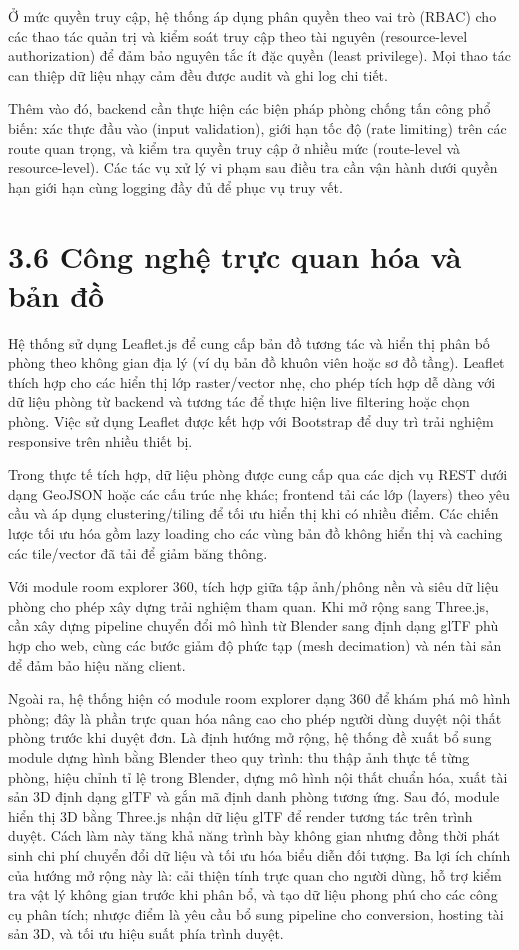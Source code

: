 \documentclass[a4paper,12pt,openany,oneside]{report}
\begin{document}
Ở mức quyền truy cập, hệ thống áp dụng phân quyền theo vai trò (RBAC) cho các thao tác quản trị và kiểm soát truy cập theo tài nguyên (resource-level authorization) để đảm bảo nguyên tắc ít đặc quyền (least privilege). Mọi thao tác can thiệp dữ liệu nhạy cảm đều được audit và ghi log chi tiết.

Thêm vào đó, backend cần thực hiện các biện pháp phòng chống tấn công phổ biến: xác thực đầu vào (input validation), giới hạn tốc độ (rate limiting) trên các route quan trọng, và kiểm tra quyền truy cập ở nhiều mức (route-level và resource-level). Các tác vụ xử lý vi phạm sau điều tra cần vận hành dưới quyền hạn giới hạn cùng logging đầy đủ để phục vụ truy vết.

\section*{3.6 Công nghệ trực quan hóa và bản đồ}
Hệ thống sử dụng Leaflet.js để cung cấp bản đồ tương tác và hiển thị phân bố phòng theo không gian địa lý (ví dụ bản đồ khuôn viên hoặc sơ đồ tầng). Leaflet thích hợp cho các hiển thị lớp raster/vector nhẹ, cho phép tích hợp dễ dàng với dữ liệu phòng từ backend và tương tác để thực hiện live filtering hoặc chọn phòng. Việc sử dụng Leaflet được kết hợp với Bootstrap để duy trì trải nghiệm responsive trên nhiều thiết bị.

Trong thực tế tích hợp, dữ liệu phòng được cung cấp qua các dịch vụ REST dưới dạng GeoJSON hoặc các cấu trúc nhẹ khác; frontend tải các lớp (layers) theo yêu cầu và áp dụng clustering/tiling để tối ưu hiển thị khi có nhiều điểm. Các chiến lược tối ưu hóa gồm lazy loading cho các vùng bản đồ không hiển thị và caching các tile/vector đã tải để giảm băng thông.

Với module room explorer 360, tích hợp giữa tập ảnh/phông nền và siêu dữ liệu phòng cho phép xây dựng trải nghiệm tham quan. Khi mở rộng sang Three.js, cần xây dựng pipeline chuyển đổi mô hình từ Blender sang định dạng glTF phù hợp cho web, cùng các bước giảm độ phức tạp (mesh decimation) và nén tài sản để đảm bảo hiệu năng client.

Ngoài ra, hệ thống hiện có module room explorer dạng 360 để khám phá mô hình phòng; đây là phần trực quan hóa nâng cao cho phép người dùng duyệt nội thất phòng trước khi duyệt đơn. Là định hướng mở rộng, hệ thống đề xuất bổ sung module dựng hình bằng Blender theo quy trình: thu thập ảnh thực tế từng phòng, hiệu chỉnh tỉ lệ trong Blender, dựng mô hình nội thất chuẩn hóa, xuất tài sản 3D định dạng glTF và gắn mã định danh phòng tương ứng. Sau đó, module hiển thị 3D bằng Three.js nhận dữ liệu glTF để render tương tác trên trình duyệt. Cách làm này tăng khả năng trình bày không gian nhưng đồng thời phát sinh chi phí chuyển đổi dữ liệu và tối ưu hóa biểu diễn đối tượng. Ba lợi ích chính của hướng mở rộng này là: cải thiện tính trực quan cho người dùng, hỗ trợ kiểm tra vật lý không gian trước khi phân bổ, và tạo dữ liệu phong phú cho các công cụ phân tích; nhược điểm là yêu cầu bổ sung pipeline cho conversion, hosting tài sản 3D, và tối ưu hiệu suất phía trình duyệt.
\end{document}
